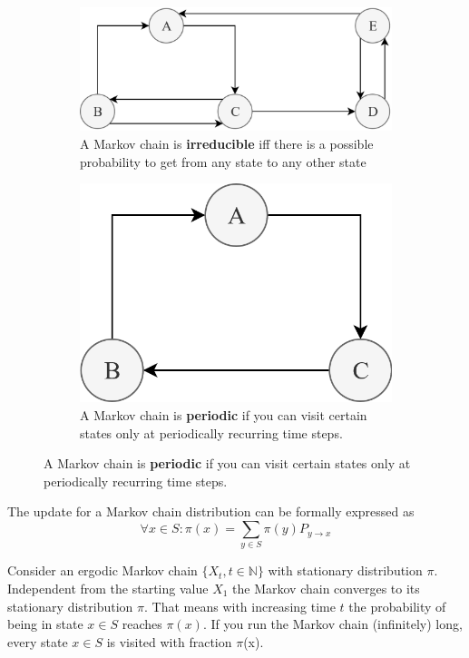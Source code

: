 \documentclass[11pt]{article}
\begin{document}
\begin{figure}[H]
	\begin{subfigure}[t]{0.45\linewidth}
		\centering
		\includegraphics[width=\linewidth]{markov_chain_irreducibility}
		\caption{A Markov chain is \textbf{irreducible} iff there is a possible probability to get from any state to any other state}
	\end{subfigure}
	\hspace{0.1\linewidth}
	\begin{subfigure}[t]{0.45\linewidth}
		\centering
		\includegraphics[width=0.6\linewidth]{markov_chain_periodicity}
		\caption{A Markov chain is \textbf{periodic} if you can visit certain states only at periodically recurring time steps.}
	\end{subfigure}
\end{figure}

The update for a Markov chain distribution can be formally expressed as
\begin{equation*}
	\forall x\in S: \pi(x) = \sum_{y\in S} \pi(y) P_{y\rightarrow x}
\end{equation*}

Consider an ergodic Markov chain $\{X_t ,t \in \mathbb{N}\}$ with stationary distribution $\pi$. Independent from the starting value $X_1$ the Markov chain converges to its stationary distribution $\pi$.
That means with increasing time $t$ the probability of being in state $x \in S$ reaches $\pi(x)$. If you run the Markov chain (infinitely) long, every state $x \in S$ is visited with fraction $\pi$(x).
\end{document}
